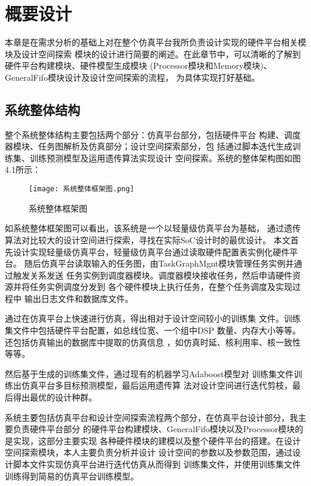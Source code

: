 
\chapter{概要设计}
本章是在需求分析的基础上对在整个仿真平台我所负责设计实现的硬件平台相关模块及设计空间探索
模块的设计进行简要的阐述。在此章节中，可以清晰的了解到硬件平台构建模块、硬件模型生成模块
(Processor模块和Memory模块)、GeneralFifo模块设计及设计空间探索的流程，
为具体实现打好基础。

\section{系统整体结构}
整个系统整体结构主要包括两个部分：仿真平台部分，包括硬件平台
构建、调度器模块、任务图解析及仿真部分；设计空间探索部分，包
括通过脚本迭代生成训练集、训练预测模型及运用遗传算法实现设计
空间探索。系统的整体架构图如图4.1所示：

\begin{figure}[h]
    \centering
    \texttt{[image: 系统整体框架图.png]}
    \caption{系统整体框架图}
    \label{fig:badge}
\end{figure}

如系统整体框架图可以看出，该系统是一个以轻量级仿真平台为基础，
通过遗传算法对比较大的设计空间进行探索，寻找在实际SoC设计时的最优设计。
本文首先设计实现轻量级仿真平台，轻量级仿真平台通过读取硬件配置表实例化硬件平台。
随后仿真平台读取输入的任务图，由TaskGraphMgnt模块管理任务实例并通过触发关系发送
任务实例到调度器模块。调度器模块接收任务，然后申请硬件资源并将任务实例调度分发到
各个硬件模块上执行任务，在整个任务调度及实现过程中 输出日志文件和数据库文件。

通过在仿真平台上快速进行仿真，得出相对于设计空间较小的训练集
文件。训练集文件中包括硬件平台配置，如总线位宽、一个组中DSP
数量、内存大小等等。还包括仿真输出的数据库中提取的仿真信息
，如仿真时延、核利用率、核一致性等等。

然后基于生成的训练集文件，通过现有的机器学习Adaboost模型\cite{29}对
训练集文件训练出仿真平台多目标预测模型\cite{30}，最后运用遗传算
法对设计空间进行迭代剪枝，最后得出最优的设计种群。

系统主要包括仿真平台和设计空间探索流程两个部分，在仿真平台设计部分，我主要负责硬件平台部分
的硬件平台构建模块、GeneralFifo模块以及Processor模块的是实现，这部分主要实现
各种硬件模块的建模以及整个硬件平台的搭建。在设计空间探索模块，本人主要负责分析并设计
设计空间的参数以及参数范围，通过设计脚本文件实现仿真平台进行迭代仿真从而得到
训练集文件，并使用训练集文件训练得到简易的仿真平台训练模型。

